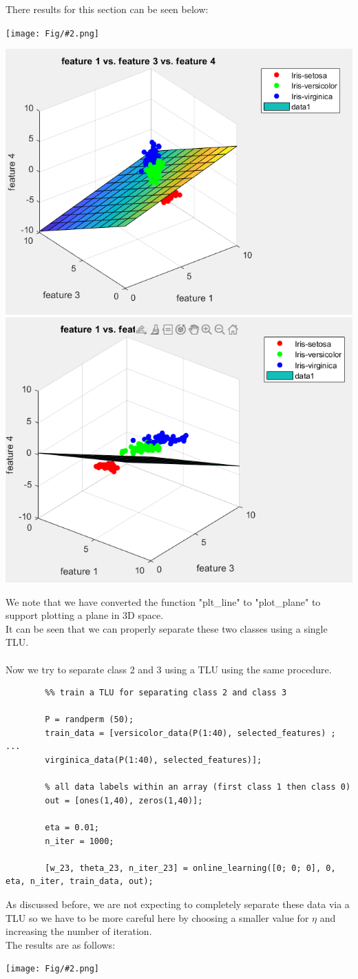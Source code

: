 \documentclass[]{article}
\newcommand{\pict}[2]{\begin{center}
		\texttt{[image: Fig/\#2.png]}
\end{center}}
\begin{document}
	There results for this section can be seen below:
	\pict{1}{Q2_F10}
	\begin{center}
		\includegraphics[width=0.4\linewidth]{Fig/Q2_F11.png}
		\qquad\qquad
		\includegraphics[width=0.4\linewidth]{Fig/Q2_F12.png}
	\end{center}
	We note that we have converted the function "plt\_line" to "plot\_plane" to support plotting a plane in 3D space.\\
	It can be seen that we can properly separate these two classes using a single TLU.\\\\
	Now we try to separate class 2 and 3 using a TLU using the same procedure.
	\begin{lstlisting}
		%% train a TLU for separating class 2 and class 3
		
		P = randperm (50);
		train_data = [versicolor_data(P(1:40), selected_features) ; ...
		virginica_data(P(1:40), selected_features)];
		
		% all data labels within an array (first class 1 then class 0)
		out = [ones(1,40), zeros(1,40)];
		
		eta = 0.01;
		n_iter = 1000;
		
		[w_23, theta_23, n_iter_23] = online_learning([0; 0; 0], 0, eta, n_iter, train_data, out);
	\end{lstlisting}
	As discussed before, we are not expecting to completely separate these data via a TLU so we have to be more careful here by choosing a smaller value for $\eta$ and increasing the number of iteration.\\
	The results are as follows:
	\pict{1}{Q2_F15}
\end{document}
